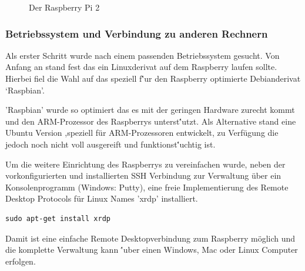 \documentclass[11pt,a4paper]{article} %
\begin{document}
	\begin{figure}[h]
	\caption{Der Raspberry Pi 2}
	\end{figure}
\newpage
\par
\subsubsection{Betriebssystem und Verbindung zu anderen Rechnern}
Als erster Schritt wurde nach einem passenden Betriebssystem gesucht. Von Anfang an stand fest das ein Linuxderivat auf dem Raspberry laufen sollte. Hierbei fiel die Wahl auf das speziell f\''ur den Raspberry optimierte Debianderivat `Raspbian'.
\par
'Raspbian' wurde so optimiert das es mit der geringen Hardware zurecht kommt und den ARM-Prozessor des Raspberrys unterst\''utzt. Als Alternative stand eine Ubuntu Version ,speziell f\"ur ARM-Prozessoren entwickelt, zu Verf\"ugung die jedoch noch nicht voll ausgereift und funktionst\''uchtig ist.
\par
 Um die weitere Einrichtung des Raspberrys zu vereinfachen wurde, neben der vorkonfigurierten und installierten SSH Verbindung zur Verwaltung \"uber ein Konsolenprogramm (Windows: Putty), eine freie Implementierung des Remote Desktop Protocols f\"ur Linux Names 'xrdp' installiert.
\begin{frame}

\begin{lstlisting}
sudo apt-get install xrdp
\end{lstlisting}

\end{frame}
Damit ist eine einfache Remote Desktopverbindung zum Raspberry m\"oglich und die komplette Verwaltung kann \''uber einen Windows, Mac oder Linux Computer erfolgen. 
\par
\end{document}
